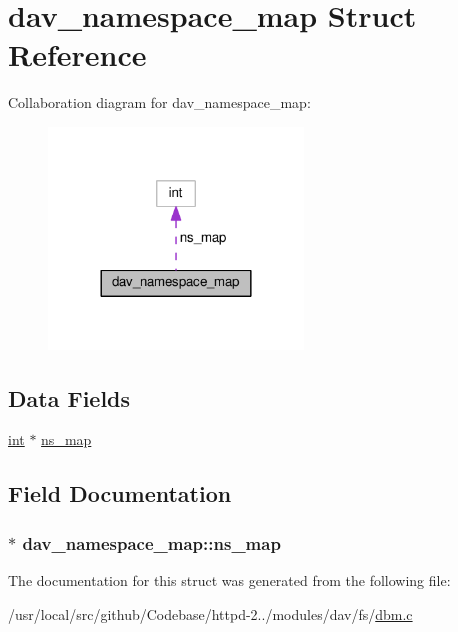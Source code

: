 \hypertarget{structdav__namespace__map}{}\section{dav\+\_\+namespace\+\_\+map Struct Reference}
\label{structdav__namespace__map}


Collaboration diagram for dav\+\_\+namespace\+\_\+map\+:
\nopagebreak
\begin{figure}[H]
\begin{center}
\leavevmode
\includegraphics[width=192pt]{structdav__namespace__map__coll__graph}
\end{center}
\end{figure}
\subsection*{Data Fields}
\begin{DoxyCompactItemize}
\item 
\hyperlink{pcre_8txt_a42dfa4ff673c82d8efe7144098fbc198}{int} $\ast$ \hyperlink{structdav__namespace__map_a719eca1efff5a3fb2b000042424a71ea}{ns\+\_\+map}
\end{DoxyCompactItemize}


\subsection{Field Documentation}
\subsubsection[{\texorpdfstring{ns\+\_\+map}{ns_map}}]{$\ast$ dav\+\_\+namespace\+\_\+map\+::ns\+\_\+map}\hypertarget{structdav__namespace__map_a719eca1efff5a3fb2b000042424a71ea}{}\label{structdav__namespace__map_a719eca1efff5a3fb2b000042424a71ea}


The documentation for this struct was generated from the following file\+:\begin{DoxyCompactItemize}
\item 
/usr/local/src/github/\+Codebase/httpd-\/2../modules/dav/fs/\hyperlink{dbm_8c}{dbm.\+c}\end{DoxyCompactItemize}
